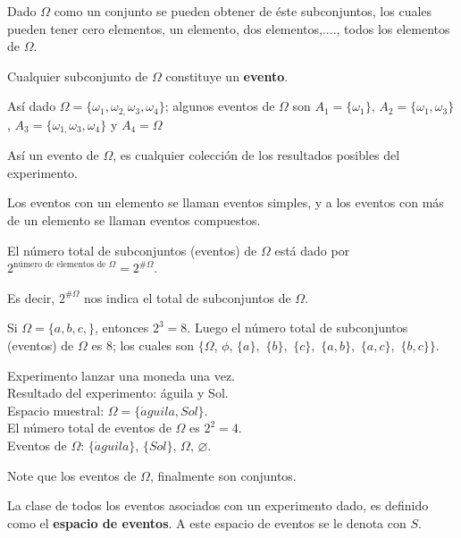 Dado $\Omega$ como un conjunto se pueden obtener de éste subconjuntos, los cuales pueden tener cero elementos, un elemento, dos elementos,...., todos los elementos de $\Omega$.

\begin{definition}
Cualquier subconjunto de $\Omega$  constituye un  \textbf{evento}.
\end{definition}

Así dado $\Omega =\{\omega_{1},\omega_{2,}\omega _{3},\omega_{4}\}$; algunos eventos de $\Omega$ son $A_1=\{\omega_{1}\}$, $A_2=\{\omega_{1},\omega_{3}\}$, $A_3=\{\omega_{1,}\omega_{3},\omega_{4}\}$ y $A_4=\Omega$

Así un evento de $\Omega$, es cualquier colección de los resultados posibles del experimento.

Los eventos con un elemento se llaman eventos simples, y a los eventos con más de un elemento se llaman eventos compuestos.
 \vspace{0.5cm}

El número total de subconjuntos (eventos) de $\Omega$ está dado por $2^{\text{número de elementos de }\Omega }=2^{\#\Omega}$.

Es decir, $2^{\#\Omega}$ nos indica el total de subconjuntos de $\Omega$.

\begin{example}
Si $\Omega =\{a,b,c,\}$, entonces $2^{3}=8$. Luego el número total de subconjuntos (eventos) de $\Omega$ es $8$; los cuales son $\{\Omega$, $\phi$, $\{a\},$ $\{b\},$ $\{c\},$ $\{a,b\},$ $\{a,c\},$ $\{b,c\}\}$.  
\end{example}


\begin{example}
Experimento lanzar una moneda una vez. \\    
Resultado del experimento: águila y Sol. \\
Espacio muestral: $\Omega=\{\acute{a}guila, Sol\}$. \\
El número total de eventos de $\Omega$ es $2^{2}=4$. \\
Eventos de $\Omega$: $\{\acute{a}guila\}$, $\{Sol\}$, $\Omega$, $\varnothing$.
\end{example}

Note que los eventos de $\Omega$, finalmente son conjuntos.

\begin{definition}
La clase de todos los eventos asociados con un experimento dado, es definido como el \textbf{espacio de eventos}. A este espacio de eventos se le denota con $S$.
\end{definition}

